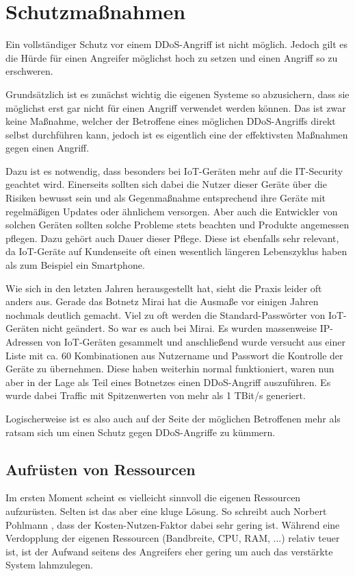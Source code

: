\chapter{Schutzmaßnahmen}
\label{chap:kapitel3}
Ein vollständiger Schutz vor einem DDoS-Angriff ist nicht möglich. Jedoch gilt es die Hürde für einen Angreifer möglichst hoch zu setzen und einen Angriff so zu erschweren.

Grundsätzlich ist es zunächst wichtig die eigenen Systeme so abzusichern, dass sie möglichst erst gar nicht für einen Angriff verwendet werden können. Das ist zwar keine Maßnahme, welcher der Betroffene eines möglichen DDoS-Angriffs direkt selbst durchführen kann, jedoch ist es eigentlich eine der effektivsten Maßnahmen gegen einen Angriff.

Dazu ist es notwendig, dass besonders bei IoT-Geräten mehr auf die IT-Security geachtet wird. Einerseits sollten sich dabei die Nutzer dieser Geräte über die Risiken bewusst sein und als Gegenmaßnahme entsprechend ihre Geräte mit regelmäßigen Updates oder ähnlichem versorgen.
Aber auch die Entwickler von solchen Geräten sollten solche Probleme stets beachten und Produkte angemessen pflegen. Dazu gehört auch Dauer dieser Pflege. Diese ist ebenfalls sehr relevant, da IoT-Geräte auf Kundenseite oft einen wesentlich längeren Lebenszyklus haben als zum Beispiel ein Smartphone.

Wie sich in den letzten Jahren herausgestellt hat, sieht die Praxis leider oft anders aus. Gerade das Botnetz \glqq Mirai\grqq{} hat die Ausmaße vor einigen Jahren nochmals deutlich gemacht. Viel zu oft werden die Standard-Passwörter von IoT-Geräten nicht geändert. So war es auch bei Mirai. Es wurden massenweise IP-Adressen von IoT-Geräten gesammelt und anschließend wurde versucht aus einer Liste mit ca. 60 Kombinationen aus Nutzername und Passwort die Kontrolle der Geräte zu übernehmen. Diese haben weiterhin normal funktioniert, waren nun aber in der Lage als Teil eines Botnetzes einen DDoS-Angriff auszuführen. Es wurde dabei Traffic mit Spitzenwerten von mehr als 1 TBit/s generiert. \cite{Mirai}

Logischerweise ist es also auch auf der Seite der möglichen Betroffenen mehr als ratsam sich um einen Schutz gegen DDoS-Angriffe zu kümmern.

\section{Aufrüsten von Ressourcen}
\label{sec:k3rsc}
Im ersten Moment scheint es vielleicht sinnvoll die eigenen Ressourcen aufzurüsten. Selten ist das aber eine kluge Lösung. So schreibt auch Norbert Pohlmann \cite{Pohlmann2019}, dass der Kosten-Nutzen-Faktor dabei sehr gering ist. Während eine Verdopplung der eigenen Ressourcen (Bandbreite, CPU, RAM, ...) relativ teuer ist, ist der Aufwand seitens des Angreifers eher gering um auch das verstärkte System lahmzulegen.

